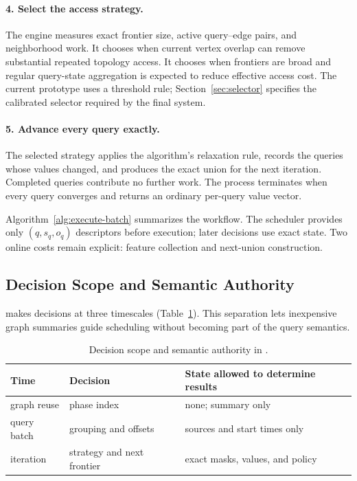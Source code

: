 \paragraph{4. Select the access strategy.}
The engine measures exact frontier size, active query--edge pairs, and neighborhood work.  It chooses \sharedexpand when current vertex overlap can remove substantial repeated topology access.  It chooses \coalescedgather when frontiers are broad and regular query-state aggregation is expected to reduce effective access cost.  The current prototype uses a threshold rule; Section~\ref{sec:selector} specifies the calibrated selector required by the final system.

\paragraph{5. Advance every query exactly.}
The selected strategy applies the algorithm's relaxation rule, records the queries whose values changed, and produces the exact union for the next iteration.  Completed queries contribute no further work.  The process terminates when every query converges and returns an ordinary per-query value vector.

Algorithm~\ref{alg:execute-batch} summarizes the workflow.  The scheduler provides only $(q,s_q,o_q)$ descriptors before execution; later decisions use exact state.  Two online costs remain explicit: feature collection and next-union construction.



\subsection{Decision Scope and Semantic Authority}

\system makes decisions at three timescales (Table~\ref{tab:timescales}).  This separation lets inexpensive graph summaries guide scheduling without becoming part of the query semantics.

\begin{table}[t]
  \centering
  \caption{Decision scope and semantic authority in \system.}
  \label{tab:timescales}
  \small
  \setlength{\tabcolsep}{3pt}
  \begin{tabular}{p{}p{}p{}}
    \toprule
    Time & Decision & State allowed to determine results \\
    \midrule
    graph reuse & phase index & none; summary only \\
    query batch & grouping and offsets & sources and start times only \\
    iteration & strategy and next frontier & exact masks, values, and policy \\
    \bottomrule
  \end{tabular}
\end{table}

